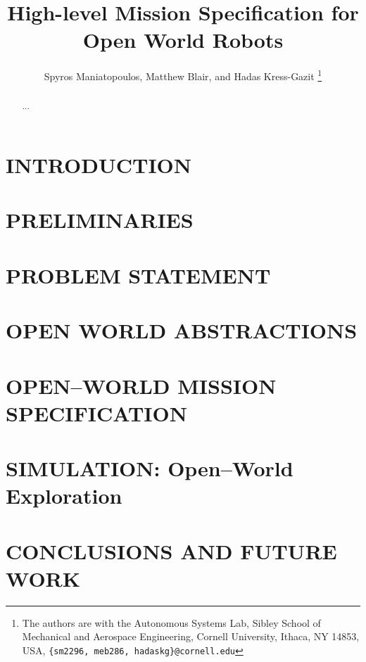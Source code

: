 \documentclass[letterpaper, 10 pt, conference]{ieeeconf}  %
\title{\LARGE \bf
	High-level Mission Specification for Open World Robots
}
\author{Spyros Maniatopoulos, Matthew Blair, and Hadas Kress-Gazit%
\thanks{The authors are with the Autonomous Systems Lab, Sibley School of Mechanical and Aerospace Engineering, Cornell University, Ithaca, NY 14853, USA, {\tt \{sm2296, meb286, hadaskg\}@cornell.edu}}%
}
\DeclareMathOperator{\F}{\rotatebox[origin=c]{45}{$\Box$}}
\DeclareMathOperator{\X}{\bigcirc}
\DeclareMathOperator{\G}{\Box}
\DeclareMathOperator{\Cox}{
    \begin{tikzpicture}[baseline=(X.base)]
    \path[use as bounding box] (-0.16,-0.17) -- (0.16,0.17);
    \node at (0,0) {\scalebox{0.8}{$\F$}}; \node (X) at(0,0) go{$\bigcirc$}; 
    \end{tikzpicture}}
\begin{document}
\maketitle
\thispagestyle{empty}
\pagestyle{empty}


\begin{abstract}

...

\end{abstract}


\section{INTRODUCTION}


\section{PRELIMINARIES}\label{preliminaries}


\section{PROBLEM STATEMENT}\label{problem}


\section{OPEN WORLD ABSTRACTIONS}\label{abstractions}


\section{OPEN--WORLD MISSION SPECIFICATION}\label{openworld}


\section{SIMULATION: Open--World Exploration}\label{simulation}  %


\section{CONCLUSIONS AND FUTURE WORK}\label{conclusion}

\end{document}
